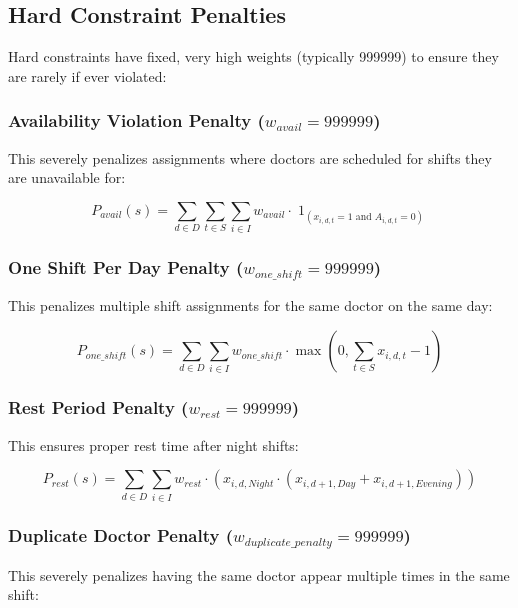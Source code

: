 \documentclass[12pt]{article}
\DeclareMathOperator{\ind}{1}
\begin{document}
\subsection{Hard Constraint Penalties}

Hard constraints have fixed, very high weights (typically 999999) to ensure they are rarely if ever violated:

\subsubsection{Availability Violation Penalty ($w_{avail} = 999999$)}
This severely penalizes assignments where doctors are scheduled for shifts they are unavailable for:

\begin{equation}
P_{avail}(s) = \sum_{d \in D} \sum_{t \in S} \sum_{i \in I} w_{avail} \cdot \ind_{(x_{i,d,t}=1 \text{ and } A_{i,d,t}=0)}
\end{equation}

\subsubsection{One Shift Per Day Penalty ($w_{one\_shift} = 999999$)}
This penalizes multiple shift assignments for the same doctor on the same day:

\begin{equation}
P_{one\_shift}(s) = \sum_{d \in D} \sum_{i \in I} w_{one\_shift} \cdot \max\left(0, \sum_{t \in S} x_{i,d,t} - 1\right)
\end{equation}

\subsubsection{Rest Period Penalty ($w_{rest} = 999999$)}
This ensures proper rest time after night shifts:

\begin{equation}
P_{rest}(s) = \sum_{d \in D} \sum_{i \in I} w_{rest} \cdot (x_{i,d,Night} \cdot (x_{i,d+1,Day} + x_{i,d+1,Evening}))
\end{equation}

\subsubsection{Duplicate Doctor Penalty ($w_{duplicate\_penalty} = 999999$)}
This severely penalizes having the same doctor appear multiple times in the same shift:
\end{document}
